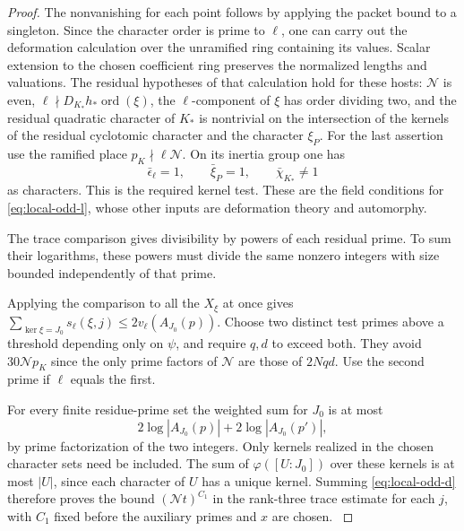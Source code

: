 \begin{proof}
The nonvanishing for each point follows by applying the packet
bound to a singleton. Since the character order is prime to
\(\ell\), one can carry out the deformation calculation over the
unramified ring containing its values. Scalar extension to
the chosen coefficient ring preserves the normalized lengths
and valuations. The residual hypotheses of that calculation
hold for these hosts: \(\mathcal N\) is even,
\(\ell\nmid D_{K_*}h_*\operatorname{ord}(\xi)\),
the \(\ell\)-component of \(\xi\) has order dividing two, and
the residual quadratic character of \(K_*\) is nontrivial on the
intersection of the kernels of the residual cyclotomic character
and the character \(\xi_P\). For the last assertion use the ramified place \(p_K\nmid\ell\mathcal N\).
On its inertia group one has
\[
 \bar\epsilon_\ell=1,\qquad\bar\xi_P=1,\qquad
            \bar\chi_{K_*}\ne1
\]
as characters. This is the required kernel test. These are the field conditions for \eqref{eq:local-odd-l}, whose other inputs are deformation theory and automorphy. \label{cor:ordinary-odd-primes-4}


The trace comparison gives divisibility by powers of each residual prime. To sum their logarithms, these powers must divide the same nonzero integers with size bounded independently of that prime.


Applying the comparison to all the \(X_\xi\) at once gives
\(\sum_{\ker\xi=J_0}s_\ell(\xi,j)\le2v_\ell(A_{J_0}(p))\).
Choose two distinct test primes above a threshold depending only
on \(\psi\), and require \(q,d\) to exceed both. They avoid
\(30\mathcal N p_K\) since the only prime factors of \(\mathcal N\)
are those of \(2Nqd\). Use the second prime if \(\ell\) equals
the first.

For every finite residue-prime set the weighted
sum for \(J_0\) is at most
\[
 2\log|A_{J_0}(p)|+2\log|A_{J_0}(p')|,
\]
by prime factorization of the two integers. Only kernels realized
in the chosen character sets need be included. The sum of
\(\varphi([U:J_0])\) over these kernels is at most \(|U|\),
since each character of \(U\) has a unique kernel. Summing \eqref{eq:local-odd-d}
therefore proves the bound \((\mathcal Nt)^{C_1}\) in the rank-three trace estimate
for each \(j\), with \(C_1\) fixed before the auxiliary primes and
\(x\) are chosen.
\label{cor:ordinary-odd-primes-5}

\end{proof}

